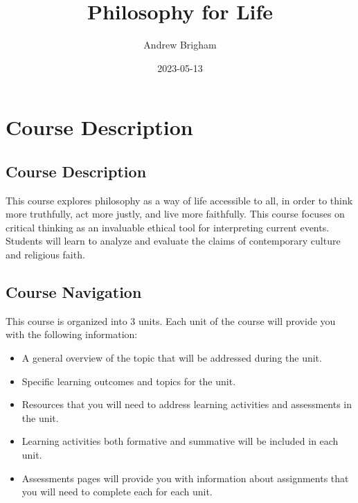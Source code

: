 \documentclass[
]{book}
\title{Philosophy for Life}
\author{Andrew Brigham}
\date{2023-05-13}
\providecommand{\tightlist}{%
  \setlength{\itemsep}{0pt}\setlength{\parskip}{0pt}}
\begin{document}
\maketitle

{
\setcounter{tocdepth}{1}
\tableofcontents
}
\hypertarget{course-description}{%
\chapter*{Course Description}\label{course-description}}

\hypertarget{course-description-1}{%
\section*{Course Description}\label{course-description-1}}

This course explores philosophy as a way of life accessible to all, in order to think more truthfully, act more justly, and live more faithfully. This course focuses on critical thinking as an invaluable ethical tool for interpreting current events. Students will learn to analyze and evaluate the claims of contemporary culture and religious faith.

\hypertarget{course-navigation}{%
\section*{Course Navigation}\label{course-navigation}}

This course is organized into 3 units. Each unit of the course will provide you with the following information:

\begin{itemize}
\tightlist
\item
  A general overview of the topic that will be addressed during the unit.\\
\item
  Specific learning outcomes and topics for the unit.\\
\item
  Resources that you will need to address learning activities and assessments in the unit.\\
\item
  Learning activities both formative and summative will be included in each unit.\\
\item
  Assessments pages will provide you with information about assignments that you will need to complete each for each unit.
\end{itemize}
\end{document}
